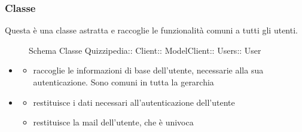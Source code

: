 \subsubsection{Classe }
Questa è una classe astratta e raccoglie le funzionalità comuni a tutti gli utenti.
\begin{figure}[H]
\centering
\noindent{}
\caption[Schema Classe User]{Schema Classe Quizzipedia:: Client:: ModelClient:: Users:: User}
\end{figure}
\begin{itemize}
\item {}
\begin{itemize}
\item {}
\newline
raccoglie le informazioni di base dell'utente, necessarie alla sua autenticazione. Sono comuni in tutta la gerarchia
\end{itemize}
\item {}
\begin{itemize}
\item {}
\newline
restituisce i dati necessari all'autenticazione dell'utente
\newline
\item {}
\newline
restituisce la mail dell'utente, che è univoca
\newline
\end{itemize}
\end{itemize}
